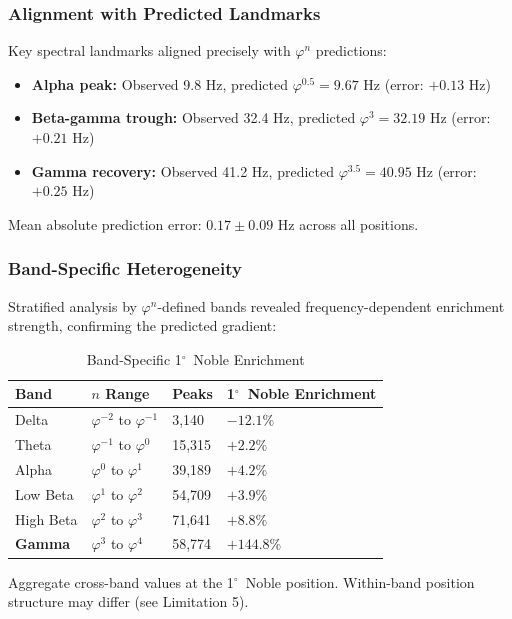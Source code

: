\documentclass[11pt,a4paper]{article}
\newcommand{\degree}{$^\circ$}  %
\newcommand{\phisym}{\varphi}
\begin{document}
\subsubsection{Alignment with Predicted Landmarks}
Key spectral landmarks aligned precisely with $\phisym^n$ predictions:
\begin{itemize}
    \item \textbf{Alpha peak:} Observed 9.8 Hz, predicted $\phisym^{0.5} = 9.67$ Hz (error: $+0.13$ Hz)
    \item \textbf{Beta-gamma trough:} Observed 32.4 Hz, predicted $\phisym^3 = 32.19$ Hz (error: $+0.21$ Hz)
    \item \textbf{Gamma recovery:} Observed 41.2 Hz, predicted $\phisym^{3.5} = 40.95$ Hz (error: $+0.25$ Hz)
\end{itemize}

Mean absolute prediction error: $0.17 \pm 0.09$ Hz across all positions.

\subsubsection{Band-Specific Heterogeneity}
Stratified analysis by $\phisym^n$-defined bands revealed frequency-dependent enrichment strength, confirming the predicted gradient:

\begin{table}[H]
\centering
\caption{Band-Specific 1\degree\ Noble Enrichment}
\label{tab:band_enrichment}
\begin{tabular}{@{}llll@{}}
\toprule
Band & $n$ Range & Peaks & 1\degree\ Noble Enrichment \\
\midrule
Delta & $\phisym^{-2}$ to $\phisym^{-1}$ & 3,140 & $-12.1\%$ \\
Theta & $\phisym^{-1}$ to $\phisym^{0}$ & 15,315 & $+2.2\%$ \\
Alpha & $\phisym^{0}$ to $\phisym^{1}$ & 39,189 & $+4.2\%$ \\
Low Beta & $\phisym^{1}$ to $\phisym^{2}$ & 54,709 & $+3.9\%$ \\
High Beta & $\phisym^{2}$ to $\phisym^{3}$ & 71,641 & $+8.8\%$ \\
\textbf{Gamma} & $\phisym^{3}$ to $\phisym^{4}$ & 58,774 & $\mathbf{+144.8\%}$ \\
\bottomrule
\end{tabular}
\begin{tablenotes}
\small
\item Aggregate cross-band values at the 1\degree\ Noble position. Within-band position structure may differ (see Limitation 5).
\end{tablenotes}
\end{table}
\end{document}
